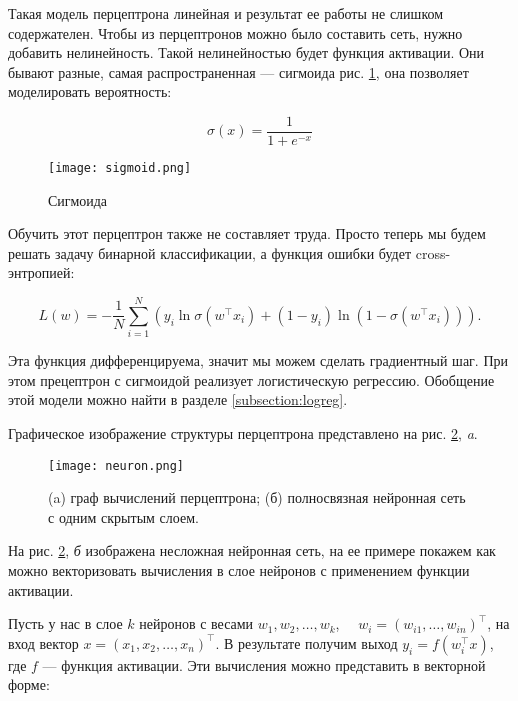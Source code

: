 \bigskip
Такая модель перцептрона линейная и результат ее работы не слишком содержателен. Чтобы из перцептронов можно
было составить сеть, нужно добавить нелинейность. Такой нелинейностью будет функция активации. Они бывают
разные, самая распространенная --- сигмоида рис. \ref{fig:sigmoid}, она позволяет моделировать вероятность:

\begin{equation} \label{eq:sigma}
    \sigma (x) = \frac{1}{1+e^{-x}}
\end{equation}

\begin{figure}[ht]
    \centering
    \texttt{[image: sigmoid.png]}
    \caption{Сигмоида}
    \label{fig:sigmoid}
\end{figure}

Обучить этот перцептрон также не составляет труда. Просто теперь мы будем решать задачу бинарной
классификации, а функция ошибки будет cross-энтропией:

\begin{equation}
 L(w) = -\frac{1}{N}\sum_{i=1}^N(y_i\ln\sigma(w^\top x_i) + (1-y_i)\ln(1-\sigma(w^\top x_i))).
\end{equation}

Эта функция дифференцируема, значит мы можем сделать градиентный шаг. При этом прецептрон с сигмоидой
реализует логистическую регрессию. Обобщение этой модели можно найти в разделе \ref{subsection:logreg}.

\bigskip
Графическое изображение структуры перцептрона представлено на рис. \ref{fig:neuron}, \textit{a}.

\begin{figure}[ht]
    \centering
    \texttt{[image: neuron.png]}
    \caption{(a) граф вычислений перцептрона; (б) полносвязная нейронная сеть с одним скрытым слоем.}
    \label{fig:neuron}
\end{figure}

На  рис. \ref{fig:neuron}, \textit{б} изображена несложная нейронная сеть, на ее примере покажем как можно
векторизовать вычисления в слое нейронов с применением функции активации.

\bigskip
Пусть у нас в слое $k$ нейронов с весами $w_1, w_2, \ldots, w_k$, $\quad w_i = (w_{i1}, \ldots, w_{in})^\top$,
на вход вектор $x = (x_1, x_2, \ldots, x_n)^\top$. В результате получим выход $y_i = f(w_i^\top x)$, где $f$
--- функция активации. Эти вычисления можно представить в векторной форме:


